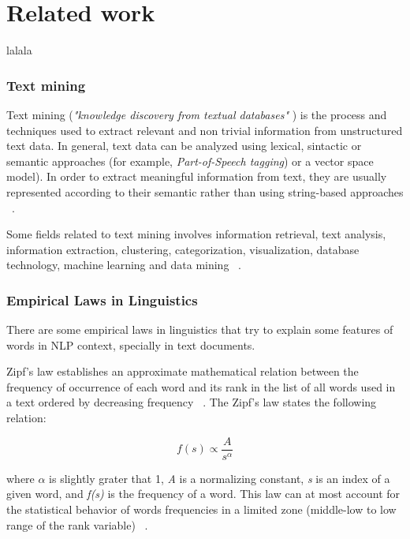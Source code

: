 
\chapter{Related work}
\label{ch:related_work}

lalala

%
\subsection{Text mining}
%
Text mining (\textit{"knowledge discovery from textual databases"} \cite{tan1999text}) is the process and techniques used to extract relevant and non trivial information from unstructured text data.  In general, text data can be analyzed using lexical, sintactic or semantic approaches (for example, \textit{Part-of-Speech tagging}) or a vector space model). In order to extract meaningful information from text, they are usually represented according to their semantic rather than using string-based approaches ~\cite{aggarwal2012mining}.

Some fields related to text mining  involves information retrieval, text analysis, information extraction, clustering, categorization, visualization, database technology, machine learning and data mining ~\cite{tan1999text}.

%
\subsection{Empirical Laws in Linguistics}
%
There are some empirical laws in linguistics that try to explain some features of words in NLP context, specially in text documents.

Zipf's  law establishes an approximate mathematical relation between the frequency of occurrence of each word and its rank in the list of all words used in a text ordered by decreasing frequency ~\cite{montemurro2001beyond}.  The Zipf's law states the following relation:

\begin{center}
\begin{equation}
\label{ZipfLaw}
f(s)  \propto  \frac{A}{s^{\alpha}} 
\end{equation}
\end{center}


where \textit{{$\alpha$}} is slightly grater that 1, \textit{A} is a normalizing constant,  \textit{s} is an index of a given word, and \textit{f(s)} is the frequency of a word. This law can at most account for the statistical behavior of words frequencies in a limited zone (middle-low to low range of the rank variable) ~\cite{montemurro2001beyond}. \\


